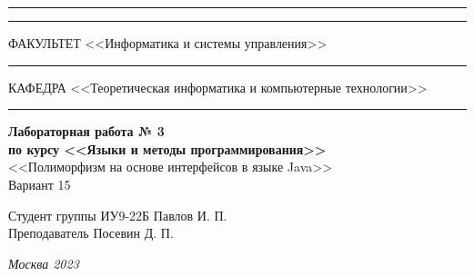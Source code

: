 \documentclass[a4paper, 14pt]{extarticle}
\begin{document}
\begin{titlepage}
\vspace{-25pt}
\hspace{-35pt}\rule{\textwidth}{2.3pt}

\vspace*{-20.3pt}
\hspace{-35pt}\rule{\textwidth}{0.4pt}

\vspace{1.5ex}
\hspace{-35pt} \noindent \small ФАКУЛЬТЕТ\hspace{80pt} <<Информатика и системы управления>>

\vspace*{-16pt}
\hspace{47pt}\rule{0.83\textwidth}{0.4pt}

\vspace{0.5ex}
\hspace{-35pt} \noindent \small КАФЕДРА\hspace{50pt} <<Теоретическая информатика и компьютерные технологии>>

\vspace*{-16pt}
\hspace{30pt}\rule{0.866\textwidth}{0.4pt}
  
\vspace{11em}

\begin{center}
\Large {\bf Лабораторная работа № 3} \\ 
\large {\bf по курсу <<Языки и методы программирования>>} \\
\large <<Полиморфизм на основе интерфейсов в языке Java>> \\
\large Вариант 15
\end{center}\normalsize

\vspace{8em}


\begin{flushright}
  {Студент группы ИУ9-22Б Павлов И. П. \hspace*{15pt}\\ 
  \vspace{2ex}
  Преподаватель Посевин Д. П.\hspace*{15pt}}
\end{flushright}

\bigskip

\vfill
 

\begin{center}
\textsl{Москва 2023}
\end{center}
\end{titlepage}
\end{document}
